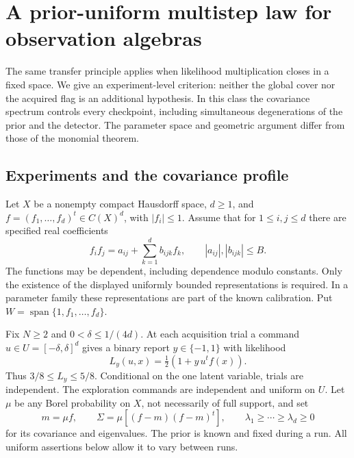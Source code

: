 \section{A prior-uniform multistep law for observation algebras}
\label{sec:algebra-multistep}
The same transfer principle applies when likelihood multiplication closes
in a fixed space. We give an experiment-level criterion: neither the
global cover nor the acquired flag is an additional hypothesis. In this
class the covariance spectrum controls every checkpoint, including
simultaneous degenerations of the prior and the detector. The parameter
space and geometric argument differ from those of the monomial theorem.

\subsection{Experiments and the covariance profile}
Let $X$ be a nonempty compact Hausdorff space, $d\ge1$, and
$f=(f_1,\ldots,f_d)^t\in C(X)^d$, with $|f_i|\le1$.
Assume that for $1\le i,j\le d$ there are specified real coefficients
\begin{equation}\label{eq:algebra-multiplication}
 f_if_j=a_{ij}+\sum_{k=1}^d b_{ijk}f_k,
 \qquad |a_{ij}|,|b_{ijk}|\le B.
\end{equation}
The functions may be dependent, including dependence modulo constants.
Only the existence of the displayed uniformly bounded representations is
required. In a parameter family these representations are part of the
known calibration. Put $W=\operatorname{span}\{1,f_1,\ldots,f_d\}$.

Fix $N\ge2$ and $0<\delta\le1/(4d)$. At each acquisition trial a
command $u\in U=[-\delta,\delta]^d$ gives a binary report $y\in\{-1,1\}$
with likelihood
\begin{equation}\label{eq:algebra-likelihood}
 L_y(u,x)=\tfrac12(1+y\,u^tf(x)).
\end{equation}
Thus $3/8\le L_y\le5/8$. Conditional on the one latent variable,
trials are independent. The exploration commands are independent and
uniform on $U$. Let $\mu$ be any Borel probability on $X$, not necessarily
of full support, and set
\begin{equation}\label{eq:algebra-covariance}
 m=\mu f,\qquad \Sigma=\mu[(f-m)(f-m)^t],\qquad
 \lambda_1\ge\cdots\ge\lambda_d\ge0
\end{equation}
for its covariance and eigenvalues. The prior is known and fixed during
a run. All uniform assertions below allow it to vary between runs.

